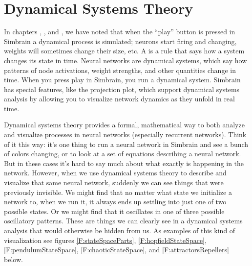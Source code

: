 \chapter{Dynamical Systems Theory}\label{ch_dst}

  In chapters , , and , we have noted that when the ``play''  button  is pressed in Simbrain a dynamical process is simulated; neurons start firing and changing, weights will sometimes change their size, etc.
A  is a rule that says how a system changes its state in time. Neural networks are dynamical systems,  which say how patterns of node activations, weight strengths, and other quantities change in time. When you press play in Simbrain, you run a dynamical system. Simbrain has special features, like the projection plot, which support dynamical systems analysis by allowing you to visualize network dynamics as they unfold in real time.

Dynamical systems theory provides a formal, mathematical way to both analyze and visualize processes in neural networks (especially recurrent networks). Think of it this way: it's one thing to run a neural network in Simbrain and see a bunch of colors changing, or to look at a set of equations describing a neural network. But in these cases it's hard to say much about what exactly is happening in the network. However, when we use dynamical systems theory to describe and visualize that same neural network, suddenly we can see things that were previously invisible. We might find that no matter what state we initialize a network to, when we run it, it always ends up settling into just one of two possible states. Or we might find that it oscillates in one of three possible oscillatory patterns. These are things we can clearly see in a dynamical systems analysis that would otherwise be hidden from us. As examples of this kind of visualization see figures \ref{F:stateSpaceParts}, \ref{F:hopfieldStateSpace}, \ref{F:pendulumStateSpace}, \ref{F:chaoticStateSpace}, and \ref{F:attractorsRepellers} below.

